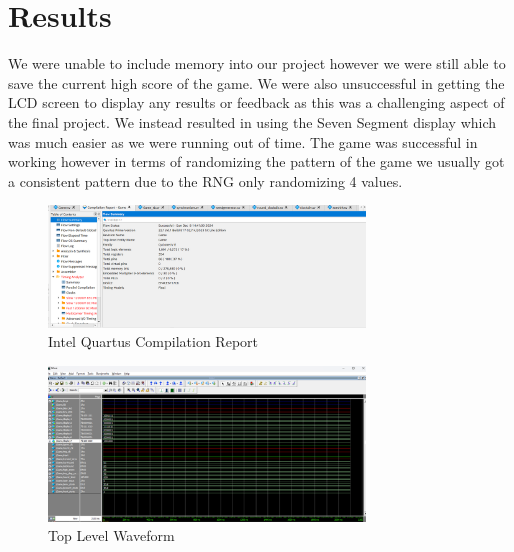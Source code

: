 \documentclass{report}
\begin{document}
\chapter{Results}
We were unable to include memory into our project however we were still able to save the current high score of the game. We were also unsuccessful in getting the LCD screen to display any results or feedback as this was a challenging aspect of the final project. We instead resulted in using the Seven Segment display which was much easier as we were running out of time. The game was successful in working however in terms of randomizing the pattern of the game we usually got a consistent pattern due to the RNG only randomizing 4 values.
\begin{figure}[H]
    \begin{center}
        \includegraphics[width=0.75\textwidth]{images/image3.png}
    \end{center}
    \caption{Intel Quartus Compilation Report}
\end{figure}
\begin{figure}[H]
    \begin{center}
        \includegraphics[width=0.75\textwidth]{images/image1.png}
    \end{center}
    \caption{Top Level Waveform}
\end{figure}
\end{document}
